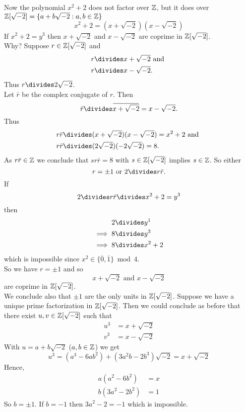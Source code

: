 \documentclass[NumTh.tex]{subfiles}
\begin{document}
Now the polynomial $x^2 + 2$  does not factor over $\mathbb{Z}$, but it does over $\mathbb{Z}[\sqrt{-2}] = \{a + b \sqrt{-2}: a,b \in \mathbb{Z}\}$
\[ x^2 + 2 = (x + \sqrt{-2}) (x - \sqrt{-2}) \]
If $x^2+2 = y^3$ then $x + \sqrt{-2}$ and $x - \sqrt{-2}$ are coprime in $\mathbb{Z}[\sqrt{-2}]$.\\
Why?
Suppose $r \in \mathbb{Z}[\sqrt{-2}]$ and
\begin{align*}
  r &\divides x + \sqrt{-2} \text{ and } \\
  r &\divides x - \sqrt{-2} \text{.}
\end{align*}
Thus $r \divides 2 \sqrt{-2}$.\\
Let $\bar{r}$ be the complex conjugate of $r$.
Then 
\[ \bar{r} \divides \overbar{x+ \sqrt{-2}} = x - \sqrt{-2} \text{.} \]
Thus
\begin{align*}
  r \bar{r} &\divides (x + \sqrt{-2})(x-\sqrt{-2}) = x^2 + 2 \text{ and } \\
  r \bar{r} &\divides (2 \sqrt{-2})(-2 \sqrt{-2}) = 8 \text{.}
\end{align*}
As $r \bar{r} \in \mathbb{Z}$ we conclude that $s r \bar{r} = 8$ with $s \in \mathbb{Z}[\sqrt{-2}]$ implies $s \in \mathbb{Z}$.
So either 
\[ r = \pm 1 \text{ or } 2 \divides r \bar{r} \text{.} \]
If 
\[ 2 \divides r \bar{r} \divides x^2 + 2 = y^3 \] 
then 
\begin{align*}
  2 &\divides y^1 \\
  \implies 8 &\divides y^3 \\ 
  \implies 8 &\divides x^2 + 2
\end{align*}
which is impossible since $x^2 \in \{ \overbar{0},\overbar{1} \} \bmod 4$.\\
So we have $r = \pm 1$ and so 
\[ x + \sqrt{-2} \text{ and } x - \sqrt{-2} \] 
are coprime in $\mathbb{Z}[\sqrt{-2}]$. \\
We conclude also that  $\pm 1$ are the only units in $\mathbb{Z}[\sqrt{-2}]$.
Suppose we have a unique prime factorization in $\mathbb{Z}[\sqrt{-2}]$.
Then we could conclude as before that there exist $u,v \in \mathbb{Z}[\sqrt{-2}]$ such that
\begin{align*}
  u^3 &= x + \sqrt{-2}\\
  v^3 &= x - \sqrt{-2}
\end{align*}
With $u = a +b \sqrt{-2}$ ($a,b\in \mathbb{Z}$) we get
\[ u^3 = (a^3 - 6ab^2) + (3a^2b - 2b^3) \sqrt{-2} = x + \sqrt{-2} \]
Hence,
\begin{align*}
  a(a^2 - 6b^2) &= x\\
  b(3a^2 - 2b^2) &= 1
\end{align*}
So $b = \pm 1$. If $b = -1$ then $3a^2 -2 = -1$ which is impossible.
\end{document}

